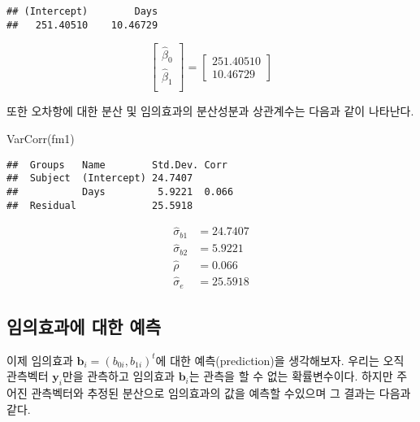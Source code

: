 \documentclass[
]{book}
\newenvironment{Shaded}{\begin{snugshade}}{\end{snugshade}}
\newcommand{\FunctionTok}[1]{\textcolor[rgb]{0.00,0.00,0.00}{#1}}
\newcommand{\NormalTok}[1]{#1}
\newcommand{\OtherTok}[1]{\textcolor[rgb]{0.56,0.35,0.01}{#1}}
\newcommand{\SpecialCharTok}[1]{\textcolor[rgb]{0.00,0.00,0.00}{#1}}
\newcommand{\bm}[1]{ \symbf{#1}}
\begin{document}
\begin{verbatim}
## (Intercept)        Days 
##   251.40510    10.46729
\end{verbatim}

\[ 
\begin{bmatrix}
\hat {\beta}_{0} \\
\hat {\beta}_{1} \\
\end{bmatrix}
= 
\begin{bmatrix}
251.40510   \\
10.46729
\end{bmatrix}
\]

또한 오차항에 대한 분산 및 임의효과의 분산성분과 상관계수는 다음과 같이 나타난다.

\begin{Shaded}
\begin{Highlighting}[]
\FunctionTok{VarCorr}\NormalTok{(fm1)}
\end{Highlighting}
\end{Shaded}

\begin{verbatim}
##  Groups   Name        Std.Dev. Corr 
##  Subject  (Intercept) 24.7407       
##           Days         5.9221  0.066
##  Residual             25.5918
\end{verbatim}

\begin{align*}
\hat \sigma_{b1} & =  24.7407 \\
\hat \sigma_{b2} & =  5.9221 \\
\hat \rho & = 0.066 \\
\hat \sigma_e & = 25.5918
\end{align*}

\hypertarget{uxc784uxc758uxd6a8uxacfcuxc5d0-uxb300uxd55c-uxc608uxce21}{%
\subsection{임의효과에 대한 예측}\label{uxc784uxc758uxd6a8uxacfcuxc5d0-uxb300uxd55c-uxc608uxce21}}

이제 임의효과 \(\bm b_i =(b_{0i}, b_{1i})^t\)에 대한 예측(prediction)을 생각해보자. 우리는 오직 관측벡터 \(\bm y_i\)만을 관측하고 임의효과 \(\bm b_i\)는 관측을 할 수 없는 확률변수이다. 하지만 주어진 관측벡터와 추정된 분산으로 임의효과의 값을 예측할 수있으며 그 결과는 다음과 같다.

\begin{Shaded}
\end{Shaded}
\end{document}
